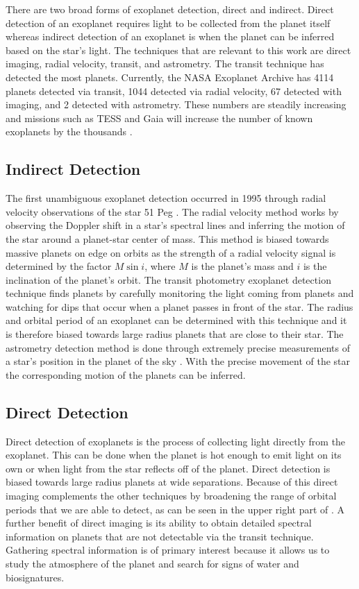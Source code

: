 There are two broad forms of exoplanet detection, direct and indirect. Direct
detection of an exoplanet requires light to be collected from the planet itself
whereas indirect detection of an exoplanet is when the planet can be inferred
based on the star's light. The techniques that are relevant to this work are
direct imaging, radial velocity, transit, and astrometry. The transit technique
has detected the most planets. Currently, the NASA Exoplanet Archive has 4114
planets detected via transit, 1044 detected via radial velocity, 67 detected
with imaging, and 2 detected with astrometry. These numbers are steadily
increasing and missions such as TESS and Gaia will increase the number of known
exoplanets by the thousands \citep{Perryman2018a} \citep{Huang2018}.

\subsection{Indirect Detection} 

The first unambiguous exoplanet detection occurred in 1995 through radial
velocity observations of the star 51 Peg \citep{mayorJupitermassCompanion1995}.
The radial velocity method works by observing the Doppler shift in a star's
spectral lines and inferring the motion of the star around a planet-star center
of mass. This method is biased towards massive planets on edge on orbits as the
strength of a radial velocity signal is determined by the factor $M\sin{i}$,
where $M$ is the planet's mass and $i$ is the inclination of the planet's
orbit. The transit photometry exoplanet detection technique finds planets by
carefully monitoring the light coming from planets and watching for dips that
occur when a planet passes in front of the star. The radius and orbital period
of an exoplanet can be determined with this technique and it is therefore
biased towards large radius planets that are close to their star. The
astrometry detection method is done through extremely precise measurements of a
star's position in the planet of the sky \citep{Perryman2018a}. With the
precise movement of the star the corresponding motion of the planets can be
inferred.


\subsection{Direct Detection}

Direct detection of exoplanets is the process of collecting light directly from
the exoplanet. This can be done when the planet is hot enough to emit light on
its own or when light from the star reflects off of the planet. Direct
detection is biased towards large radius planets at wide separations. Because
of this direct imaging complements the other techniques by broadening the range
of orbital periods that we are able to detect, as can be seen in the upper
right part of . A further benefit of
direct imaging is its ability to obtain detailed spectral information on
planets that are not detectable via the transit technique. Gathering spectral
information is of primary interest because it allows us to study the atmosphere
of the planet and search for signs of water and biosignatures.

